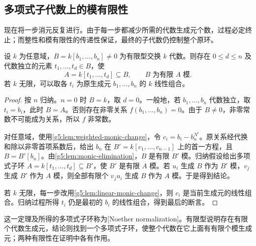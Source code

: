 \subsection{多项式子代数上的模有限性}
\label{g5:subsec:0302:04}

现在将一步消元反复进行。由于每一步都减少所需的代数生成元个数，过程必定终止；而整性和模有限性的传递性保证，最终的子代数仍控制整个原环。

\begin{theorem}\label{g5:thm:noether-normalization}
	设 \(k\) 为任意域，\(B=k[b_1,\ldots,b_n]\ne0\) 为有限型交换 \(k\) 代数。则存在 \(0\leq d\leq n\) 及代数独立的元素 \(t_1,\ldots,t_d\in B\)，使
	\[
	A=k[t_1,\ldots,t_d]\subseteq B,\qquad B\text{ 为有限 }A\text{ 模}.
	\]
	若 \(k\) 无限，可以取各 \(t_i\) 为原生成元 \(b_1,\ldots,b_n\) 的 \(k\) 线性组合。
\end{theorem}
\begin{proof}
	按 \(n\) 归纳。\(n=0\) 时 \(B=k\)，取 \(d=0\)。一般地，若 \(b_1,\ldots,b_n\) 代数独立，取 \(t_i=b_i\)，此时 \(B=A\)。否则存在非零关系 \(f(b_1,\ldots,b_n)=0\)。由于 \(B\ne0\)，非零常数不可能成为关系，所以 \(f\) 非常数。

	对任意域，使用\cref{g5:lem:weighted-monic-change}，令
	\(c_i=b_i-b_n^{N^i}\)。原关系经代换和除以非零首项系数后，给出 \(b_n\) 在
	\(B'=k[c_1,\ldots,c_{n-1}]\)
	上的首一方程，且 \(B=B'[b_n]\)。由\cref{g5:lem:monic-elimination}，\(B\) 是有限 \(B'\) 模。归纳假设给出多项式子环
	\(A=k[t_1,\ldots,t_d]\subseteq B'\)，使 \(B'\) 是有限 \(A\) 模。若 \(u_i\) 生成 \(B\) 作为 \(B'\) 模，\(v_j\) 生成 \(B'\) 作为 \(A\) 模，则全部有限个 \(v_ju_i\) 生成 \(B\) 作为 \(A\) 模。于是得到结论。

	若 \(k\) 无限，每一步改用\cref{g5:lem:linear-monic-change}，则 \(c_i\) 是当前生成元的线性组合。归纳过程所得 \(t_i\) 仍是最初的 \(b_i\) 的线性组合，得到最后的断言。
\end{proof}

这一定理及所得的多项式子环称为[Noether normalization]。有限型说明存在有限个代数生成元，结论则找到一个多项式子环，使整个代数在它上面有有限个模生成元；两种有限性在证明中各有作用。

